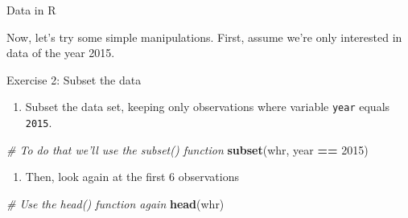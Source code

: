 \documentclass[ignorenonframetext,]{beamer}
\newenvironment{Shaded}{\begin{snugshade}}{\end{snugshade}}
\newcommand{\KeywordTok}[1]{\textcolor[rgb]{0.13,0.29,0.53}{\textbf{#1}}}
\newcommand{\DecValTok}[1]{\textcolor[rgb]{0.00,0.00,0.81}{#1}}
\newcommand{\StringTok}[1]{\textcolor[rgb]{0.31,0.60,0.02}{#1}}
\newcommand{\CommentTok}[1]{\textcolor[rgb]{0.56,0.35,0.01}{\textit{#1}}}
\newcommand{\OperatorTok}[1]{\textcolor[rgb]{0.81,0.36,0.00}{\textbf{#1}}}
\newcommand{\NormalTok}[1]{#1}
\providecommand{\tightlist}{%
  \setlength{\itemsep}{0pt}\setlength{\parskip}{0pt}}
\begin{document}
\begin{frame}[fragile]{Data in R}

Now, let's try some simple manipulations. First, assume we're only
interested in data of the year 2015.

\begin{block}{Exercise 2: Subset the data}

\begin{enumerate}
\def\labelenumi{\arabic{enumi}.}
\tightlist
\item
  Subset the data set, keeping only observations where variable
  \texttt{year} equals \texttt{2015}.
\end{enumerate}

\begin{Shaded}
\begin{Highlighting}[]
\CommentTok{# To do that we'll use the subset() function}
\KeywordTok{subset}\NormalTok{(whr, year }\OperatorTok{==}\StringTok{ }\DecValTok{2015}\NormalTok{)}
\end{Highlighting}
\end{Shaded}

\begin{enumerate}
\def\labelenumi{\arabic{enumi}.}
\setcounter{enumi}{1}
\tightlist
\item
  Then, look again at the first 6 observations
\end{enumerate}

\begin{Shaded}
\begin{Highlighting}[]
\CommentTok{# Use the head() function again}
\KeywordTok{head}\NormalTok{(whr)}
\end{Highlighting}
\end{Shaded}

\end{block}

\end{frame}
\end{document}
